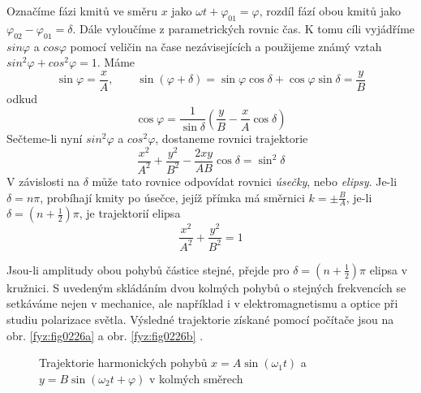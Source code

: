       Označíme fázi kmitů ve směru $x$ jako $\omega t+\varphi_{01} = \varphi$, rozdíl fází obou 
      kmitů jako $\varphi_{02}-\varphi_{01} =\delta$. Dále vyloučíme z parametrických rovnic čas. K 
      tomu cíli vyjádříme $sin\varphi$ a $cos\varphi$ pomocí veličin na čase nezávisejících a 
      použijeme známý vztah $sin^2\varphi + cos^2\varphi = 1$. Máme
      \begin{equation}\label{mech:eq_lissajous2}
          \sin\varphi=\frac{x}{A}, \qquad 
          \sin(\varphi+\delta)=\sin\varphi\cos\delta+\cos\varphi\sin\delta=\frac{y}{B}
      \end{equation}
      odkud
      \begin{equation}\label{mech:eq_lissajous3}
          \cos\varphi=\frac{1}{\sin\delta}\left(\frac{y}{B}-\frac{x}{A}\cos\delta\right)
      \end{equation}
      Sečteme-li nyní $sin^2\varphi$ a $cos^2\varphi$, dostaneme rovnici trajektorie
      \begin{equation}\label{mech:eq_lissajous4}
          \frac{x^2}{A^2}+\frac{y^2}{B^2}-\frac{2xy}{AB}\cos\delta=\sin^2\delta
      \end{equation}
      V závislosti na $\delta$ může tato rovnice odpovídat rovnici \emph{úsečky}, nebo 
      \emph{elipsy}. Je-li $\delta = n\pi$, probíhají kmity po úsečce, jejíž přímka má směrnici $k 
      = \pm\frac{B}{A}$, je-li $\delta = \left(n + \frac{1}{2}\right)\pi$, je trajektorií
      elipsa
      \begin{equation}\label{mech:eq_lissajous5}
          \frac{x^2}{A^2}+\frac{y^2}{B^2}=1
      \end{equation}

      Jsou-li amplitudy obou pohybů částice stejné, přejde pro \(\delta =  
      \left(n+\frac{1}{2}\right)\pi\) elipsa v kružnici. S uvedeným skládáním dvou kolmých pohybů o 
      stejných frekvencích se setkáváme nejen v mechanice, ale například i v elektromagnetismu a 
      optice při studiu polarizace světla. Výsledné trajektorie získané pomocí počítače jsou na 
      obr. \ref{fyz:fig0226a} a obr. \ref{fyz:fig0226b} \cite{Stoll}.

      \begin{figure}
        \centering
            {} 
            {}
        \caption[Skládání harm. pohybů v kolmých směrech]{Trajektorie harmonických pohybů
                 $x=A\sin(\omega_1 t)$ a $y=B\sin(\omega_2 t+\varphi)$ v kolmých směrech}
        \label{fyz:fig0226}
      \end{figure}

